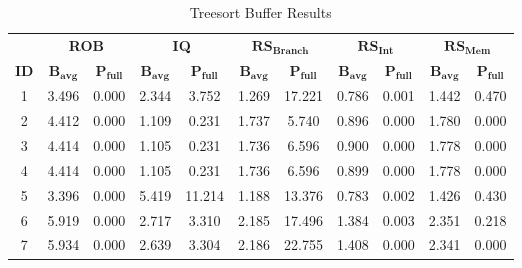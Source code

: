 \begin{table}[]
\centering
\caption{Treesort Buffer Results}
\label{tab:buffers_Treesort}
\begin{tabular}{|c|cc|cc|cc|cc|cc|}
\hline& \multicolumn{2}{c|}{\textbf{ROB}} & \multicolumn{2}{c|}{\textbf{IQ}} & \multicolumn{2}{c|}{$\mathbf{RS_{Branch}}$} & \multicolumn{2}{c|}{$\mathbf{RS_{Int}}$} & \multicolumn{2}{c|}{$\mathbf{RS_{Mem}}$} \\ \cline{2-11}
\multirow{-2}{*}{\cellcolor[HTML]{EFEFEF}\textbf{ID}} & $\mathbf{B_{avg}}$ & \cellcolor[HTML]{EFEFEF}$\mathbf{P_{full}}$ & $\mathbf{B_{avg}}$ & \cellcolor[HTML]{EFEFEF}$\mathbf{P_{full}}$ & $\mathbf{B_{avg}}$ & \cellcolor[HTML]{EFEFEF}$\mathbf{P_{full}}$ & $\mathbf{B_{avg}}$ & \cellcolor[HTML]{EFEFEF}$\mathbf{P_{full}}$ & $\mathbf{B_{avg}}$ & \cellcolor[HTML]{EFEFEF}$\mathbf{P_{full}}$ \\ \hline
1 & 3.496 & \cellcolor[HTML]{EFEFEF}0.000 & 2.344 & \cellcolor[HTML]{EFEFEF}3.752 & 1.269 & \cellcolor[HTML]{EFEFEF}17.221 & 0.786 & \cellcolor[HTML]{EFEFEF}0.001 & 1.442 & \cellcolor[HTML]{EFEFEF}0.470 \\ \hline
2 & 4.412 & \cellcolor[HTML]{EFEFEF}0.000 & 1.109 & \cellcolor[HTML]{EFEFEF}0.231 & 1.737 & \cellcolor[HTML]{EFEFEF}5.740 & 0.896 & \cellcolor[HTML]{EFEFEF}0.000 & 1.780 & \cellcolor[HTML]{EFEFEF}0.000 \\ \hline
3 & 4.414 & \cellcolor[HTML]{EFEFEF}0.000 & 1.105 & \cellcolor[HTML]{EFEFEF}0.231 & 1.736 & \cellcolor[HTML]{EFEFEF}6.596 & 0.900 & \cellcolor[HTML]{EFEFEF}0.000 & 1.778 & \cellcolor[HTML]{EFEFEF}0.000 \\ \hline
4 & 4.414 & \cellcolor[HTML]{EFEFEF}0.000 & 1.105 & \cellcolor[HTML]{EFEFEF}0.231 & 1.736 & \cellcolor[HTML]{EFEFEF}6.596 & 0.899 & \cellcolor[HTML]{EFEFEF}0.000 & 1.778 & \cellcolor[HTML]{EFEFEF}0.000 \\ \hline
5 & 3.396 & \cellcolor[HTML]{EFEFEF}0.000 & 5.419 & \cellcolor[HTML]{EFEFEF}11.214 & 1.188 & \cellcolor[HTML]{EFEFEF}13.376 & 0.783 & \cellcolor[HTML]{EFEFEF}0.002 & 1.426 & \cellcolor[HTML]{EFEFEF}0.430 \\ \hline
6 & 5.919 & \cellcolor[HTML]{EFEFEF}0.000 & 2.717 & \cellcolor[HTML]{EFEFEF}3.310 & 2.185 & \cellcolor[HTML]{EFEFEF}17.496 & 1.384 & \cellcolor[HTML]{EFEFEF}0.003 & 2.351 & \cellcolor[HTML]{EFEFEF}0.218 \\ \hline
7 & 5.934 & \cellcolor[HTML]{EFEFEF}0.000 & 2.639 & \cellcolor[HTML]{EFEFEF}3.304 & 2.186 & \cellcolor[HTML]{EFEFEF}22.755 & 1.408 & \cellcolor[HTML]{EFEFEF}0.000 & 2.341 & \cellcolor[HTML]{EFEFEF}0.000 \\ \hline

\end{tabular}
\end{table}
